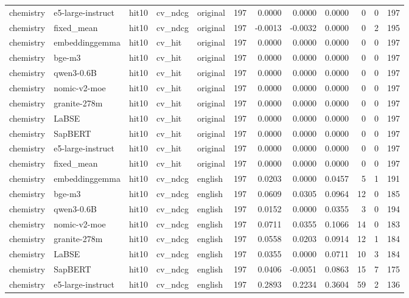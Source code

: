 \begin{tabular}{lllllrrrrrrr}
chemistry & e5-large-instruct & hit10 & cv\_ndcg & original & 197 & 0.0000 & 0.0000 & 0.0000 & 0 & 0 & 197 \\
chemistry & fixed\_mean & hit10 & cv\_ndcg & original & 197 & -0.0013 & -0.0032 & 0.0000 & 0 & 2 & 195 \\
chemistry & embeddinggemma & hit10 & cv\_hit & original & 197 & 0.0000 & 0.0000 & 0.0000 & 0 & 0 & 197 \\
chemistry & bge-m3 & hit10 & cv\_hit & original & 197 & 0.0000 & 0.0000 & 0.0000 & 0 & 0 & 197 \\
chemistry & qwen3-0.6B & hit10 & cv\_hit & original & 197 & 0.0000 & 0.0000 & 0.0000 & 0 & 0 & 197 \\
chemistry & nomic-v2-moe & hit10 & cv\_hit & original & 197 & 0.0000 & 0.0000 & 0.0000 & 0 & 0 & 197 \\
chemistry & granite-278m & hit10 & cv\_hit & original & 197 & 0.0000 & 0.0000 & 0.0000 & 0 & 0 & 197 \\
chemistry & LaBSE & hit10 & cv\_hit & original & 197 & 0.0000 & 0.0000 & 0.0000 & 0 & 0 & 197 \\
chemistry & SapBERT & hit10 & cv\_hit & original & 197 & 0.0000 & 0.0000 & 0.0000 & 0 & 0 & 197 \\
chemistry & e5-large-instruct & hit10 & cv\_hit & original & 197 & 0.0000 & 0.0000 & 0.0000 & 0 & 0 & 197 \\
chemistry & fixed\_mean & hit10 & cv\_hit & original & 197 & 0.0000 & 0.0000 & 0.0000 & 0 & 0 & 197 \\
chemistry & embeddinggemma & hit10 & cv\_ndcg & english & 197 & 0.0203 & 0.0000 & 0.0457 & 5 & 1 & 191 \\
chemistry & bge-m3 & hit10 & cv\_ndcg & english & 197 & 0.0609 & 0.0305 & 0.0964 & 12 & 0 & 185 \\
chemistry & qwen3-0.6B & hit10 & cv\_ndcg & english & 197 & 0.0152 & 0.0000 & 0.0355 & 3 & 0 & 194 \\
chemistry & nomic-v2-moe & hit10 & cv\_ndcg & english & 197 & 0.0711 & 0.0355 & 0.1066 & 14 & 0 & 183 \\
chemistry & granite-278m & hit10 & cv\_ndcg & english & 197 & 0.0558 & 0.0203 & 0.0914 & 12 & 1 & 184 \\
chemistry & LaBSE & hit10 & cv\_ndcg & english & 197 & 0.0355 & 0.0000 & 0.0711 & 10 & 3 & 184 \\
chemistry & SapBERT & hit10 & cv\_ndcg & english & 197 & 0.0406 & -0.0051 & 0.0863 & 15 & 7 & 175 \\
chemistry & e5-large-instruct & hit10 & cv\_ndcg & english & 197 & 0.2893 & 0.2234 & 0.3604 & 59 & 2 & 136 \\

\end{tabular}
